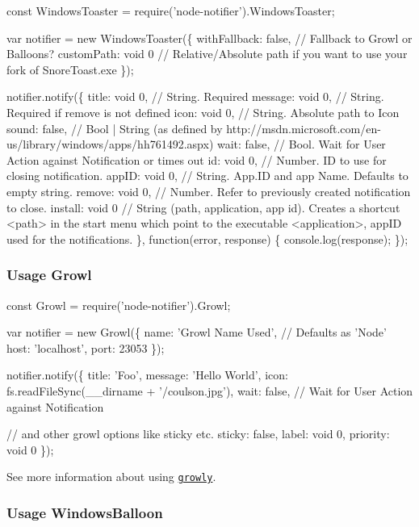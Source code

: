 \begin{DoxyCode}
const WindowsToaster = require('node-notifier').WindowsToaster;

var notifier = new WindowsToaster(\{
  withFallback: false, // Fallback to Growl or Balloons?
  customPath: void 0 // Relative/Absolute path if you want to use your fork of SnoreToast.exe
\});

notifier.notify(\{
  title: void 0, // String. Required
  message: void 0, // String. Required if remove is not defined
  icon: void 0, // String. Absolute path to Icon
  sound: false, // Bool | String (as defined by
       http://msdn.microsoft.com/en-us/library/windows/apps/hh761492.aspx)
  wait: false, // Bool. Wait for User Action against Notification or times out
  id: void 0, // Number. ID to use for closing notification.
  appID: void 0, // String. App.ID and app Name. Defaults to empty string.
  remove: void 0, // Number. Refer to previously created notification to close.
  install: void 0 // String (path, application, app id).  Creates a shortcut <path> in the start menu which
       point to the executable <application>, appID used for the notifications.
\}, function(error, response) \{
  console.log(response);
\});
\end{DoxyCode}


\subsubsection*{Usage Growl}


\begin{DoxyCode}
const Growl = require('node-notifier').Growl;

var notifier = new Growl(\{
  name: 'Growl Name Used', // Defaults as 'Node'
  host: 'localhost',
  port: 23053
\});

notifier.notify(\{
  title: 'Foo',
  message: 'Hello World',
  icon: fs.readFileSync(\_\_dirname + '/coulson.jpg'),
  wait: false, // Wait for User Action against Notification

  // and other growl options like sticky etc.
  sticky: false,
  label: void 0,
  priority: void 0
\});
\end{DoxyCode}


See more information about using \href{https://github.com/theabraham/growly/}{\tt growly}.

\subsubsection*{Usage Windows\+Balloon}

